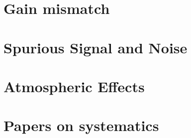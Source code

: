 \documentclass[
12pt, %
letterpaper, %
oneside, %
headinclude,footinclude, %
BCOR5mm, %
]{scrartcl}
\begin{document}
\section{Gain mismatch}





\section{Spurious Signal and Noise}


\section{Atmospheric Effects}


\section{Papers on systematics}




 


\renewcommand{\refname}{\spacedlowsmallcaps{References}} %


\end{document}
